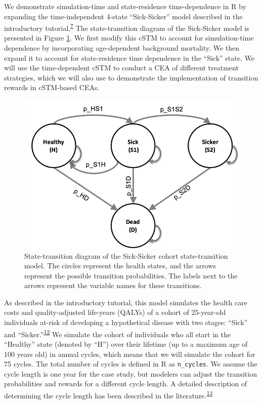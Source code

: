 \documentclass[
]{article}
\begin{document}
We demonstrate simulation-time and state-residence time-dependence in R by expanding the time-independent 4-state ``Sick-Sicker'' model described in the introductory tutorial.\textsuperscript{\protect\hyperlink{ref-Alarid-Escudero2022b}{7}} The state-transition diagram of the Sick-Sicker model is presented in Figure \ref{fig:STD-Sick-Sicker}. We first modify this cSTM to account for simulation-time dependence by incorporating age-dependent background mortality. We then expand it to account for state-residence time dependence in the ``Sick'' state. We will use the time-dependent cSTM to conduct a CEA of different treatment strategies, which we will also use to demonstrate the implementation of transition rewards in cSTM-based CEAs.

\begin{figure}[H]

{\centering \includegraphics[width=10.64in]{figs/Sick-Sicker} 

}

\caption{State-transition diagram of the Sick-Sicker cohort state-transition model. The circles represent the health states, and the arrows represent the possible transition probabilities. The labels next to the arrows represent the variable names for these transitions.}\label{fig:STD-Sick-Sicker}
\end{figure}

As described in the introductory tutorial, this model simulates the health care costs and quality-adjusted life-years (QALYs) of a cohort of 25-year-old individuals at-risk of developing a hypothetical disease with two stages: ``Sick'' and ``Sicker.''\textsuperscript{\protect\hyperlink{ref-Enns2015e}{12}} We simulate the cohort of individuals who all start in the ``Healthy'' state (denoted by ``H'') over their lifetime (up to a maximum age of 100 years old) in annual cycles, which means that we will simulate the cohort for 75 cycles. The total number of cycles is defined in R as \texttt{n\_cycles}. We assume the cycle length is one year for the case study, but modelers can adjust the transition probabilities and rewards for a different cycle length. A detailed description of determining the cycle length has been described in the literature.\textsuperscript{\protect\hyperlink{ref-OMahony2015}{13}}
\end{document}
